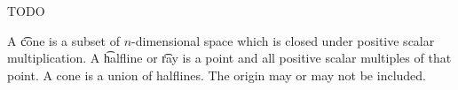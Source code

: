 

TODO


A \t{cone} is a subset of $n$-dimensional space which is closed under positive scalar multiplication.
A \t{halfline} or \t{ray} is a point and all positive scalar multiples of that point.
A cone is a union of halflines.
The origin may or may not be included.

